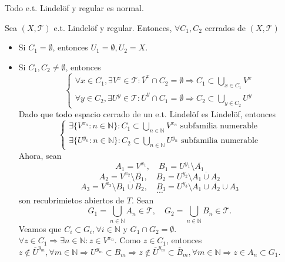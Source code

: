 \begin{prop}
  Todo e.t. Lindelöf y regular es normal.
\end{prop}

\begin{dem}
  Sea $ ( X, \mathcal{T} )$ e.t. Lindelöf y regular. Entonces, $\forall C_{1}, C_{2}$ cerrados de $ ( X, \mathcal{T} )$
  \begin{itemize}
    \item Si $C_{1} = \emptyset$, entonces $U_{1} = \emptyset, U_{2} = X$.
    \item Si $C_{1}, C_{2} \neq \emptyset$, entonces
      \[
        \begin{cases}
          \forall x \in C_{1}, \exists V^{x} \in \mathcal{T} : \overline{V}^{x} \cap C_{2} = \emptyset  \Rightarrow C_{1} \subset \bigcup_{x \in C_{1}} V^{x} \\
          \forall y \in C_{2}, \exists U^{y} \in \mathcal{T} : \overline{U}^{y} \cap C_{1} = \emptyset \Rightarrow C_{2} \subset \bigcup_{y \in C_{2}} U^{y}
        \end{cases}
      \]
      Dado que todo espacio cerrado de un e.t. Lindelöf es Lindelöf, entonces
      \[ 
        \begin{cases}
          \exists \{ V^{x_{n}} : n \in \mathbb{N} \} : C_{1} \subset \bigcup_{n \in \mathbb{N}} V^{x_{n}} \text{ subfamilia numerable} \\
          \exists \{ U^{y_{n}} : n \in \mathbb{N} \} : C_{2} \subset \bigcup_{n \in \mathbb{N}} U^{y_{n}} \text{  subfamilia numerable}
        \end{cases} 
      \] 
      Ahora, sean
      \[ 
        A_{1} = V^{x_{1}}, \quad B_{1} = U^{y_{1}} \setminus \overline{A_{1}} 
      \] 
      \[ 
        A_{2} = V^{x_{2}} \setminus \overline{B_{1}}, \quad B_{2} = U^{y_{2}} \setminus \overline{A_{1} \cup A_{2}} 
      \] 
      \[ 
        A_{3} = V^{x_{3}} \setminus \overline{B_{1} \cup B_{2}}, \quad B_{3} = U^{y_{3}} \setminus \overline{A_{1} \cup A_{2} \cup A_{3}} 
      \] 
      \[ 
        \cdots 
      \] 
      son recubrimietos abiertos de $T$. Sean
      \[ 
        G_{1} = \bigcup_{n \in \mathbb{N}} A_{n} \in \mathcal{T}, \quad G_{2} = \bigcup_{n \in \mathbb{N}} B_{n} \in \mathcal{T}.
      \]
      Veamos que $C_{i} \subset G_{i}, \forall i \in \mathbb{N}$ y $G_{1} \cap G_{2} = \emptyset$. \\

       $\forall z \in C_{1} \Rightarrow \exists n \in \mathbb{N} : z \in V^{x_{n}}$. Como $z \in C_{1}$, entonces $z \not \in \overline{U}^{y_{m}}, \forall m \in \mathbb{N} \Rightarrow U^{y_{m}} \subset B_{m} \Rightarrow z \not \in \overline{U}^{y_{m}} \subset \overline{B}_{m}, \forall m \in \mathbb{N} \Rightarrow z \in A_{n} \subset G_{1}$. \\


\end{itemize}
\end{dem}
